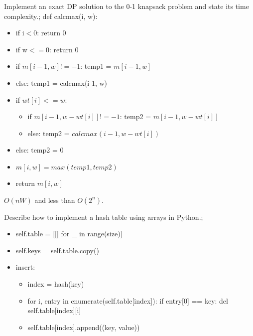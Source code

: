 \documentclass{article}
\begin{document}
Implement an exact DP solution  to the 0-1 knapsack problem and state its time complexity.; def calcmax(i, w): \begin{itemize} \item if i$<$0: return 0 \item if w$<=$0: return 0 \item if $m[i-1,w] != -1$: temp1 = $m[i-1,w]$ \item else: temp1 = calcmax(i-1, w) \item if $wt[i] <= w$: \begin{itemize} \item if $m[i-1,w-wt[i]] != -1$: temp2 = $m[i-1, w-wt[i]]$ \item else: temp2 = $calcmax(i-1, w-wt[i])$ \end{itemize} \item else: temp2 = 0 \item $m[i,w]=max(temp1, temp2)$ \item return $m[i,w]$ \end{itemize} $O(nW)$ and less than $O(2^n)$.

Describe how to implement a hash table using arrays in Python.; \begin{itemize} \item self.table = [[] for \_ in range(size)] \item self.keys = self.table.copy() \item insert: \begin{itemize} \item index = hash(key) \item for i, entry in enumerate(self.table[index]): if entry[0] == key: del self.table[index][i] \item self.table[index].append((key, value)) \end{itemize} \end{itemize}
\end{document}
